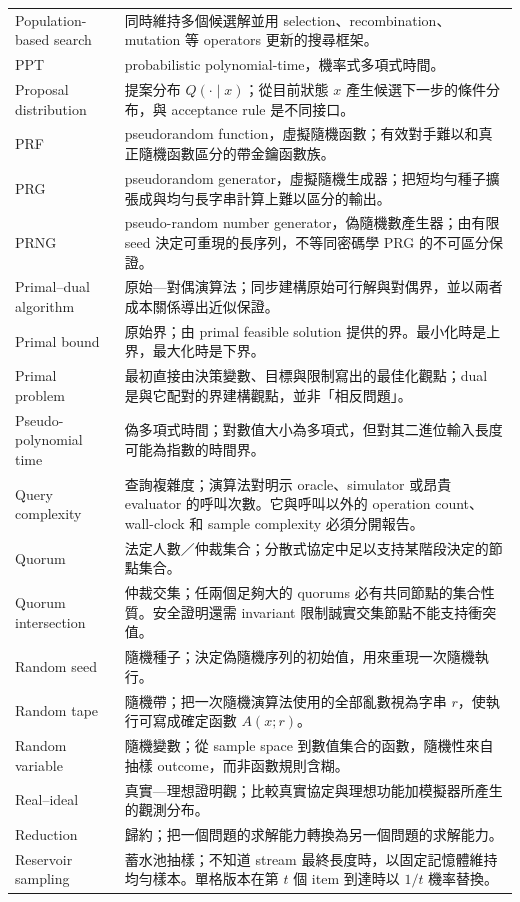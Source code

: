 \documentclass[11pt,a4paper,oneside,openany]{book}
\begin{document}
\begin{longtable}{@{}>{\raggedright\arraybackslash}p{}p{}@{}}
Population-based search & 同時維持多個候選解並用 selection、recombination、mutation 等 operators 更新的搜尋框架。 \\
PPT & probabilistic polynomial-time，機率式多項式時間。 \\
Proposal distribution & 提案分布 $Q(\cdot\mid x)$；從目前狀態 $x$ 產生候選下一步的條件分布，與 acceptance rule 是不同接口。 \\
PRF & pseudorandom function，虛擬隨機函數；有效對手難以和真正隨機函數區分的帶金鑰函數族。 \\
PRG & pseudorandom generator，虛擬隨機生成器；把短均勻種子擴張成與均勻長字串計算上難以區分的輸出。 \\
PRNG & pseudo-random number generator，偽隨機數產生器；由有限 seed 決定可重現的長序列，不等同密碼學 PRG 的不可區分保證。 \\
Primal--dual algorithm & 原始—對偶演算法；同步建構原始可行解與對偶界，並以兩者成本關係導出近似保證。 \\
Primal bound & 原始界；由 primal feasible solution 提供的界。最小化時是上界，最大化時是下界。 \\
Primal problem & 最初直接由決策變數、目標與限制寫出的最佳化觀點；dual 是與它配對的界建構觀點，並非「相反問題」。 \\
Pseudo-polynomial time & 偽多項式時間；對數值大小為多項式，但對其二進位輸入長度可能為指數的時間界。 \\
Query complexity & 查詢複雜度；演算法對明示 oracle、simulator 或昂貴 evaluator 的呼叫次數。它與呼叫以外的 operation count、wall-clock 和 sample complexity 必須分開報告。 \\
Quorum & 法定人數／仲裁集合；分散式協定中足以支持某階段決定的節點集合。 \\
Quorum intersection & 仲裁交集；任兩個足夠大的 quorums 必有共同節點的集合性質。安全證明還需 invariant 限制誠實交集節點不能支持衝突值。 \\
Random seed & 隨機種子；決定偽隨機序列的初始值，用來重現一次隨機執行。 \\
Random tape & 隨機帶；把一次隨機演算法使用的全部亂數視為字串 $r$，使執行可寫成確定函數 $A(x;r)$。 \\
Random variable & 隨機變數；從 sample space 到數值集合的函數，隨機性來自抽樣 outcome，而非函數規則含糊。 \\
Real--ideal & 真實—理想證明觀；比較真實協定與理想功能加模擬器所產生的觀測分布。 \\
Reduction & 歸約；把一個問題的求解能力轉換為另一個問題的求解能力。 \\
Reservoir sampling & 蓄水池抽樣；不知道 stream 最終長度時，以固定記憶體維持均勻樣本。單格版本在第 $t$ 個 item 到達時以 $1/t$ 機率替換。 \\

\end{longtable}
\end{document}
